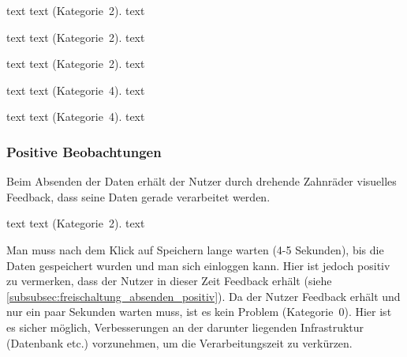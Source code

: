 {
text
}
{
text  (Kategorie~2).
}
{
text
}

{
text
}
{
text  (Kategorie~2).
}
{
text
}

{
text
}
{
text  (Kategorie~2).
}
{
text
}

{
text
}
{
text  (Kategorie~4).
}
{
text
}

{
text
}
{
text  (Kategorie~4).
}
{
text
}


\subsubsection*{Positive Beobachtungen}
\label{subsubsec:freischaltung_absenden_positiv}
Beim Absenden der Daten erhält der Nutzer durch drehende Zahnräder visuelles Feedback, dass seine Daten gerade verarbeitet werden.

{
text
}
{
text  (Kategorie~2).
}
{
text
}

{
Man muss nach dem Klick auf Speichern lange warten (4-5 Sekunden), bis die Daten gespeichert wurden und man sich einloggen kann. Hier ist jedoch positiv zu vermerken, dass der Nutzer in dieser Zeit Feedback erhält (siehe \ref{subsubsec:freischaltung_absenden_positiv}).
}
{
Da der Nutzer Feedback erhält und nur ein paar Sekunden warten muss, ist es kein Problem (Kategorie~0).
}
{
Hier ist es sicher möglich, Verbesserungen an der darunter liegenden Infrastruktur (Datenbank etc.) vorzunehmen, um die Verarbeitungszeit zu verkürzen.
}
